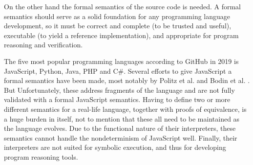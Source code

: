 On the other hand the formal semantics of the source code is needed.  A formal semantics should serve as a solid foundation for any programming language development, so it must be correct and complete (to be trusted and useful), executable (to yield a reference implementation), and appropriate for program reasoning and verification.

The five most popular programming languages according to GitHub in 2019 is JavaScript, Python, Java, PHP and C\#. Several efforts to give JavaScript a formal semantics have been made, most notably by Politz et al. \cite{Politz} and Bodin et al. \cite{Bodin}. But Unfortunately, these address fragments of the language and are not fully validated with a formal JavaScript semantics. Having to define two or more different semantics for a real-life language, together with proofs of equivalence, is a huge burden in itself, not to mention that these all need to be maintained as the language evolves. Due to the functional nature of their interpreters, these semantics cannot handle the nondeterminism of JavaScript well. Finally, their interpreters are not suited for symbolic execution, and thus for developing program reasoning tools.


{}
